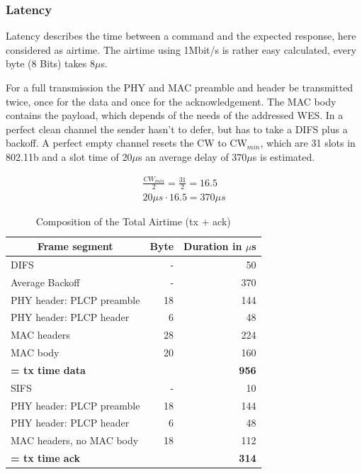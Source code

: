 \subsubsection*{Latency}

Latency describes the time between a command and the expected response, here considered as airtime.
The airtime using 1Mbit/s is rather easy calculated, every byte (8 Bits) takes 8$\mu$s.

For a full transmission the PHY and MAC preamble and header be transmitted twice, once for the data and once for the acknowledgement.
The MAC body contains the payload, which depends of the needs of the addressed \ac{WES}.
In a perfect clean channel the sender hasn't to defer, but has to take a \ac{DIFS} plus a backoff.
A perfect empty channel resets the CW to CW$_{min}$, which are 31 slots in 802.11b
and a slot time of 20$\mu$s an average delay of $370\mu$s is estimated.

\begin{align}
	\frac{CW_{min}}{2}=\frac{31}{2}=16.5 \\
	20\mu s \cdot 16.5 = 370\mu s
\end{align}

\begin{table}[h]
	\centering
	\begin{tabular} { lrr }
		\toprule
		\multicolumn{1}{c}{Frame segment}
		& \multicolumn{1}{c}{Byte}
		& \multicolumn{1}{c}{Duration in $\mu$s} \\
		\midrule
		DIFS								& -		& 50 \\
		Average Backoff						& -		& 370 \\
		PHY header: PLCP preamble			& 18	& 144 \\
		PHY header: PLCP header				& 6 	& 48 \\
		MAC headers							& 28	& 224 \\
		MAC body							& 20 	& 160 \\
		\textbf{= tx time data}				& 		& \textbf{956} \\
		SIFS								& -		& 10 \\
		PHY header: PLCP preamble			& 18	& 144 \\
		PHY header: PLCP header				& 6		& 48 \\
		MAC headers, no MAC body	 		& 18	& 112 \\
		\textbf{= tx time ack}				& 		& \textbf{314} \\
		\bottomrule
	\end{tabular}
	\caption{Composition of the Total Airtime (tx + ack)}
	\label{tab:airtime_unicast_calc}
\end{table}

